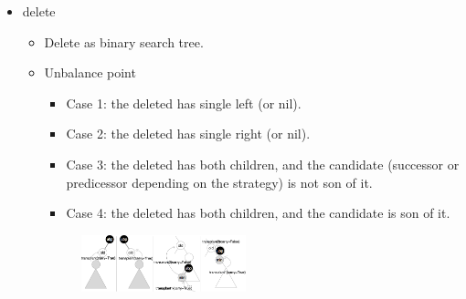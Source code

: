 \documentclass[twocolumn]{article}
\begin{document}
\begin{itemize}
  \item delete
    \begin{itemize}
    \item Delete as binary search tree.
    \item Unbalance point
      \begin{itemize}
      \item Case 1: the deleted has single left (or nil).
      \item Case 2: the deleted has single right (or nil).
      \item Case 3: the deleted has both children, and the candidate (successor or predicessor depending on the strategy) is not son of it.
      \item Case 4: the deleted has both children, and the candidate is son of it.
      \end{itemize}
      \begin{figure}[H]
      \centering
      \includegraphics[width=0.48\textwidth]{assets/avl-ubp}
      \end{figure}

    \end{itemize}
\end{itemize}

\end{document}
